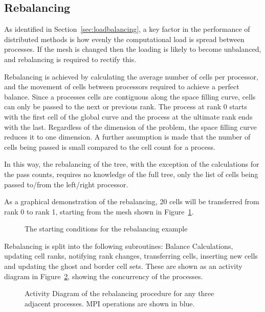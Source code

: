 \documentclass[twoside]{IIBproject}
\numberwithin{figure}{section}
\begin{document}


    \subsection{Rebalancing} %
        \label{sec:rebalancing}

        As identified in Section~\ref{sec:loadbalancing}, a key factor in the performance of distributed methods is how evenly the computational load is spread between processes. If the mesh is changed then the loading is likely to become unbalanced, and rebalancing is required to rectify this. 

        Rebalancing is achieved by calculating the average number of cells per processor, and the movement of cells between processors required to achieve a perfect balance. Since a processes cells are contiguous along the space filling curve, cells can only be passed to the next or previous rank. The process at rank 0 starts with the first cell of the global curve and the process at the ultimate rank ends with the last. Regardless of the dimension of the problem, the space filling curve reduces it to one dimension. A further assumption is made that the number of cells being passed is small compared to the cell count for a process.

        In this way, the rebalancing of the tree, with the exception of the calculations for the pass counts, requires no knowledge of the full tree, only the list of cells being passed to/from the left/right processor.

        As a graphical demonstration of the rebalancing, 20 cells will be transferred from rank 0 to rank 1, starting from the mesh shown in Figure~\ref{fig:rebalance-init}.

        \begin{figure}[H]
            
            \caption{The starting conditions for the rebalancing example}
            \label{fig:rebalance-init}
        \end{figure}

        Rebalancing is split into the following subroutines: Balance Calculations, updating cell ranks, notifying rank changes, transferring cells, inserting new cells and updating the ghost and border cell sets. These are shown as an activity diagram in Figure~\ref{fig:rebalance-overview}, showing the concurrency of the processes.

        \begin{figure}[H]
            
            \caption{Activity Diagram of the rebalancing procedure for any three adjacent processes. MPI operations are shown in blue.}
            \label{fig:rebalance-overview}
        \end{figure}
\end{document}
